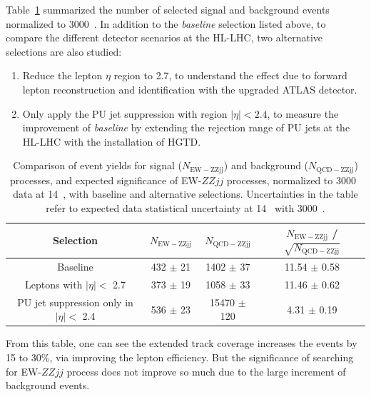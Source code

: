 Table~\ref{tab:event_yield} summarized the number of selected signal and background events normalized to 3000~\ifb.
In addition to the \textit{baseline} selection listed above, to compare the different detector scenarios at the HL-LHC, two alternative selections are also studied:
\begin{enumerate}
	\item Reduce the lepton $\eta$ region to 2.7, to understand the effect due to forward lepton reconstruction and identification with the upgraded ATLAS detector.
	\item Only apply the PU jet suppression with region $|\eta| < 2.4$, to measure the improvement of \textit{baseline} by extending the rejection range of PU jets at the HL-LHC with the installation of HGTD.
\end{enumerate}
\begin{table}[htbp]
  \small
  \centering
  \begin{tabular}{|c|c|c|c|}
    \hline
    Selection & $N_{\mathrm{EW-ZZjj}}$ & $N_{\mathrm{QCD-ZZjj}}$ & $N_{\mathrm{EW-ZZjj}}$ / $\sqrt{N_{\mathrm{QCD-ZZjj}}}$ \\
    \hline
    Baseline                                 & 432 $\pm$ 21 & 1402 $\pm$ 37   & 11.54 $\pm$ 0.58 \\
    \hline
    Leptons with $|\eta|<$ 2.7               & 373 $\pm$ 19 & 1058 $\pm$ 33   & 11.46 $\pm$ 0.62 \\
    \hline
    PU jet suppression only in $|\eta|<$ 2.4 & 536 $\pm$ 23 & 15470 $\pm$ 120 &  4.31 $\pm$ 0.19  \\
    \hline
  \end{tabular}
  \caption{
    Comparison of event yields for signal ($N_{\mathrm{EW-ZZjj}}$) and background ($N_{\mathrm{QCD-ZZjj}}$) processes, 
    and expected significance of EW-$ZZjj$ processes,
    normalized to 3000~\ifb{} data at 14~\TeV{},
    with baseline and alternative selections.
    Uncertainties in the table refer to expected data statistical uncertainty at 14~\TeV{} with 3000~\ifb{}.
  }
  \label{tab:event_yield}
\end{table}
From this table, one can see the extended track coverage increases the \lllljj events by 15 to 30\%, via improving the lepton efficiency.
But the significance of searching for EW-$ZZjj$ process does not improve so much due to the large increment of background events.

